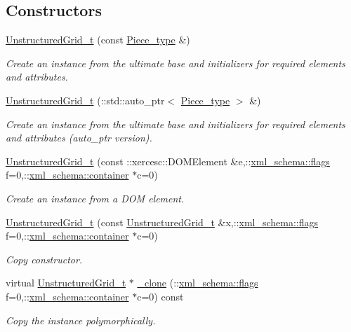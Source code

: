 \subsection*{Constructors}
\begin{DoxyCompactItemize}
\item 
\hyperlink{classUnstructuredGrid__t_a00bf6957ea7e3313e2890bd4c02f8981}{Unstructured\+Grid\+\_\+t} (const \hyperlink{classUnstructuredGrid__t_a559913611314b34f4868027fc91e35bc}{Piece\+\_\+type} \&)
\begin{DoxyCompactList}\small\item\em Create an instance from the ultimate base and initializers for required elements and attributes. \end{DoxyCompactList}\item 
\hyperlink{classUnstructuredGrid__t_a528c5e53cac3c45f9e5a2ff37197d1c8}{Unstructured\+Grid\+\_\+t} (\+::std\+::auto\+\_\+ptr$<$ \hyperlink{classUnstructuredGrid__t_a559913611314b34f4868027fc91e35bc}{Piece\+\_\+type} $>$ \&)
\begin{DoxyCompactList}\small\item\em Create an instance from the ultimate base and initializers for required elements and attributes (auto\+\_\+ptr version). \end{DoxyCompactList}\item 
\hyperlink{classUnstructuredGrid__t_ad6fb3d97ad8d9443d53e1152a9fa6004}{Unstructured\+Grid\+\_\+t} (const \+::xercesc\+::\+D\+O\+M\+Element \&e,\+::\hyperlink{namespacexml__schema_a8d981c127a1f5106d04ad5853e707361}{xml\+\_\+schema\+::flags} f=0,\+::\hyperlink{namespacexml__schema_a395f5179c5fc4643909d66e9ff28d8ca}{xml\+\_\+schema\+::container} $\ast$c=0)
\begin{DoxyCompactList}\small\item\em Create an instance from a D\+O\+M element. \end{DoxyCompactList}\item 
\hyperlink{classUnstructuredGrid__t_a893b6debad8369f36a3cdc2aaa22b478}{Unstructured\+Grid\+\_\+t} (const \hyperlink{classUnstructuredGrid__t}{Unstructured\+Grid\+\_\+t} \&x,\+::\hyperlink{namespacexml__schema_a8d981c127a1f5106d04ad5853e707361}{xml\+\_\+schema\+::flags} f=0,\+::\hyperlink{namespacexml__schema_a395f5179c5fc4643909d66e9ff28d8ca}{xml\+\_\+schema\+::container} $\ast$c=0)
\begin{DoxyCompactList}\small\item\em Copy constructor. \end{DoxyCompactList}\item 
virtual \hyperlink{classUnstructuredGrid__t}{Unstructured\+Grid\+\_\+t} $\ast$ \hyperlink{classUnstructuredGrid__t_ae51f374b8650e990f30723bdcf181f2d}{\+\_\+clone} (\+::\hyperlink{namespacexml__schema_a8d981c127a1f5106d04ad5853e707361}{xml\+\_\+schema\+::flags} f=0,\+::\hyperlink{namespacexml__schema_a395f5179c5fc4643909d66e9ff28d8ca}{xml\+\_\+schema\+::container} $\ast$c=0) const 
\begin{DoxyCompactList}\small\item\em Copy the instance polymorphically. \end{DoxyCompactList}\end{DoxyCompactItemize}


